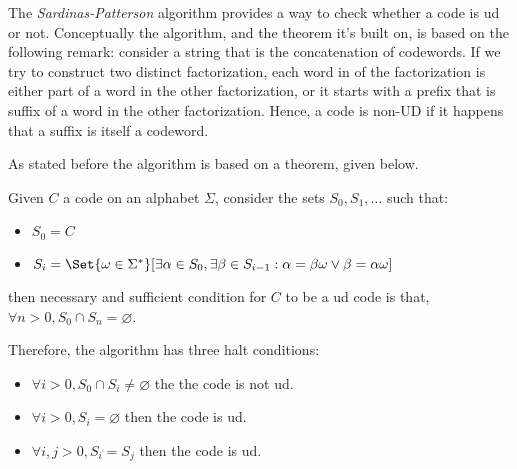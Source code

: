 \documentclass{subfiles}
\begin{document}
    The \emph{Sardinas-Patterson} algorithm provides a way to check whether a code is \gls{ud} or not. 
        Conceptually the algorithm, and the theorem it's built on,
        is based on the following remark: 
        consider a string that is the concatenation of codewords.
        If we try to construct two distinct factorization, 
        each word in of the factorization is either 
        \textcolor{rpIris}{part of a word in the other factorization,
        or it starts with a prefix that is suffix of a word in the other factorization}.
        Hence, a code is non-UD if it happens that a suffix is itself a codeword.

    As stated before the algorithm is based on a theorem, given below.
    \begin{theorem}\label{Thm:1}
        Given \(C\) a code on an alphabet \(\Sigma\), 
            consider the sets \(S_{0}, S_{1}, \ldots\) such that:
            \begin{itemize}
                \item \(S_{0} = C\)
                \item \(S_{i} = \Set{\omega \in \Sigma^{*}}[
                    \exists \alpha \in S_{0}, \exists \beta \in S_{i - 1} : 
                    \alpha = \beta \omega \lor \beta = \alpha \omega
                ]\)
            \end{itemize}
            then necessary and sufficient condition for \(C\) to be a \gls{ud} code is that,
            \(\forall n > 0, S_{0} \cap S_{n} = \varnothing\).
    \end{theorem}
    Therefore, the algorithm has three halt conditions:
    \begin{itemize}
        \item \(\forall i > 0,  S_{0} \cap S_{i} \neq \varnothing\) the the code is not \gls{ud}.
        \item \(\forall i > 0, S_{i} = \varnothing\) then the code is \gls{ud}.
        \item \(\forall i, j > 0, S_{i} = S_{j}\) then the code is \gls{ud}.
    \end{itemize}
\end{document}
